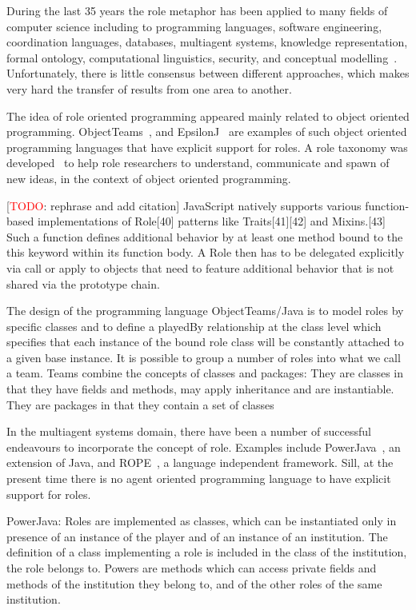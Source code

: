 \documentclass[a4paper,12pt,oneside,fleqn]{book} %
\newcommand{\todo}[1]{[\textcolor{red}{TODO}: #1]}
\begin{document}
During the last 35 years the role metaphor has been applied to many fields
of computer science including to programming languages, software
engineering, coordination languages, databases, multiagent systems,
knowledge representation, formal ontology, computational linguistics,
security, and conceptual modelling~\cite{DBLP:journals/ao/BoellaTV07}.
Unfortunately, there is little consensus between different approaches,
which makes very hard the transfer of results from one area to another.

The idea of role oriented programming appeared mainly related to object
oriented programming.  ObjectTeams~\cite{DBLP:journals/ao/Herrmann07}, and
EpsilonJ~\cite{DBLP:conf/snpd/MonpratarnchaiT08} are examples of such
object oriented programming languages that have explicit support for roles.
A role taxonomy was developed~\cite{graversen06nature} to help role
researchers to understand, communicate and spawn of new ideas, in the
context of object oriented programming.

\todo{rephrase and add citation}
JavaScript natively supports various function-based implementations of
Role[40] patterns like Traits[41][42] and Mixins.[43] Such a function
defines additional behavior by at least one method bound to the this
keyword within its function body. A Role then has to be delegated
explicitly via call or apply to objects that need to feature additional
behavior that is not shared via the prototype chain.


The design of the programming language ObjectTeams/Java is to model roles
by specific classes and to define a playedBy relationship at the class
level which specifies that each instance of the bound role class will be
constantly attached to a given base instance. It is possible  to group a
number of roles into what we call a team.  Teams combine the concepts of
classes and packages: They are classes in that they have fields and
methods, may apply inheritance and are instantiable. They are packages in
that they contain a set of classes

In the multiagent systems domain, there have been a number of successful
endeavours to incorporate the concept of role. Examples include
PowerJava~\cite{DBLP:journals/entcs/BaldoniBT06}, an extension of Java, and
ROPE~\cite{DBLP:conf/coopis/BechtGKM99}, a language independent framework.
Sill, at the present time there is no agent oriented programming language
to have explicit support for roles.

PowerJava: Roles are implemented as classes, which can be instantiated only
in presence of an instance of the player and of an instance of an
institution. The definition of a class implementing a role is included in
the class of the institution, the role belongs to. Powers are methods which
can access private fields and methods of the institution they belong to,
and of the other roles of the same institution.
\end{document}
